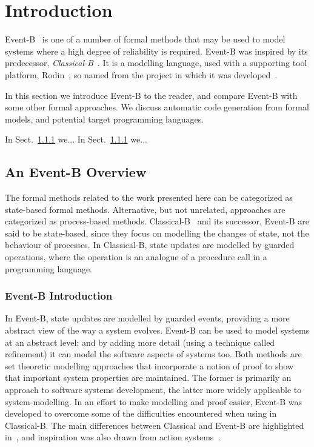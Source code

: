 \section{Introduction}
Event-B~\cite{ABR10} is one of a number of formal methods that may be used to model systems where a high degree of reliability is required. Event-B was inspired by its predecessor, \emph{Classical-B}~\cite{TheBBook}. It is a modelling language, used with a supporting tool platform, Rodin~\cite{abrial10rodin}; so named from the project in which it was developed~\cite{RodinTool}.  

In this section we introduce Event-B to the reader, and compare Event-B with some other formal approaches. We discuss automatic code generation from formal models, and potential target programming languages.

In Sect.~\ref{} we...
In Sect.~\ref{} we...

\subsection{An Event-B Overview}
The formal methods related to the work presented here can be categorized as state-based formal methods. Alternative, but not unrelated, approaches are categorized as process-based methods. Classical-B~\cite{TheBBook,CNP,CNPInterface,B4Free} and its successor, Event-B are said to be state-based, since they focus on modelling the changes of state, not the behaviour of processes. In Classical-B, state updates are modelled by guarded operations, where the operation is an analogue of a procedure call in a programming language.

\subsubsection{Event-B Introduction}
 In Event-B, state updates are modelled by guarded events, providing a more abstract view of the way a system evolves. Event-B can be used to model systems at an abstract level; and by adding more detail (using a technique called refinement) it can model the software aspects of systems too. Both methods are set theoretic modelling approaches that incorporate a notion of proof to show that important system properties are maintained. The former is primarily an approach to software systems development, the latter more widely applicable to system-modelling. In an effort to make modelling and proof easier, Event-B was developed to overcome some of the difficulties encountered when using in Classical-B. The main differences between Classical and Event-B are highlighted in~\cite{Hallerstede07}, and inspiration was also drawn from action systems~\cite{Back1990133}.

